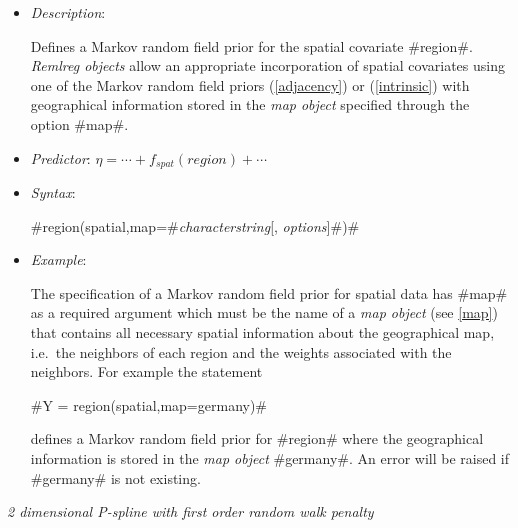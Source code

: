 \begin{itemize}
\item[] {\em Description}:

Defines a Markov random field prior for the spatial covariate
#region#. {\em Remlreg objects} allow an appropriate incorporation
of spatial covariates using one of the Markov random field priors
(\ref{adjacency}) or (\ref{intrinsic}) with geographical
information stored in the {\em map object} specified through the option
#map#.
\item[] {\em Predictor}: $\eta = \cdots + f_{spat}(region) + \cdots$
\item[] {\em Syntax}:

#region(spatial,map=#{\em characterstring}[, {\em options}]#)#
\item[] {\em Example}:

The specification of a Markov random field prior for spatial data
has #map# as a required argument which must be the name of a {\em
map object} (see \autoref{map}) that contains all necessary
spatial information about the geographical map, i.e.~the neighbors
of each region and the weights associated with the neighbors. For
example the statement

#Y = region(spatial,map=germany)#

defines a Markov random field prior for #region# where the
geographical information is stored in the {\em map object} #germany#. An
error will be raised if #germany# is not existing.
\end{itemize}

{\em 2 dimensional P-spline with first order random walk penalty}

